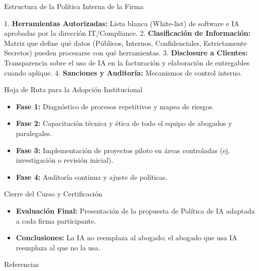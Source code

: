 \documentclass[aspectratio=169]{beamer}
\begin{document}
\begin{frame}[fragile]{Estructura de la Política Interna de la Firma}


1. \textbf{Herramientas Autorizadas:} Lista blanca (White-list) de software e IA aprobadas por la dirección IT/Compliance.
2. \textbf{Clasificación de Información:} Matriz que define qué datos (Públicos, Internos, Confidenciales, Estrictamente Secretos) pueden procesarse con qué herramientas.
3. \textbf{Disclosure a Clientes:} Transparencia sobre el uso de IA en la facturación y elaboración de entregables cuando aplique.
4. \textbf{Sanciones y Auditoría:} Mecanismos de control interno.

\end{frame}



\begin{frame}[fragile]{Hoja de Ruta para la Adopción Institucional}


\begin{itemize}
  \item \textbf{Fase 1:} Diagnóstico de procesos repetitivos y mapeo de riesgos.
  \item \textbf{Fase 2:} Capacitación técnica y ética de todo el equipo de abogados y paralegales.
  \item \textbf{Fase 3:} Implementación de proyectos piloto en áreas controladas (ej. investigación o revisión inicial).
  \item \textbf{Fase 4:} Auditoría continua y ajuste de políticas.
\end{itemize}
\end{frame}



\begin{frame}[fragile]{Cierre del Curso y Certificación}


\begin{itemize}
  \item \textbf{Evaluación Final:} Presentación de la propuesta de Política de IA adaptada a cada firma participante.
  \item \textbf{Conclusiones:} La IA no reemplaza al abogado; el abogado que usa IA reemplaza al que no la usa.
\end{itemize}
\end{frame}




\begin{frame}[allowframebreaks]{Referencias}
  
  
\end{frame}
\end{document}

